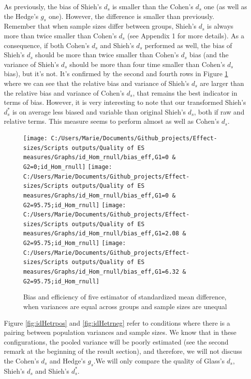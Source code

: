 \documentclass[
  man,floatsintext]{apa6}
\begin{document}
As previously, the bias of Shieh's \(d_s\) is smaller than the Cohen's \(d_s\) one (as well as the Hedge's \(g_s\) one). However, the difference is smaller than previously. Remember that when sample sizes differ between groups, Shieh's \(d_s\) is always more than twice smaller than Cohen's \(d_s\) (see Appendix 1 for more details). As a consequence, if both Cohen's \(d_s\) and Shieh's \(d_s\) performed as well, the bias of Shieh's \(d_s\) should be more than twice smaller than Cohen's \(d_s\) bias (and the variance of Shieh's \(d_s\) should be more than four time smaller than Cohen's \(d_s\) bias), but it's not. It's confirmed by the second and fourth rows in Figure \ref{fig:idHomrnull} where we can see that the relative bias and variance of Shieh's \(d_s\) are larger than the relative bias and variance of Cohen's \(d_s\), that remains the best indicator in terms of bias. However, it is very interesting to note that our transformed Shieh's \(d^*_s\) is on average less biased and variable than original Shieh's \(d_s\), both if raw and relative terms. This measure seems to perform almost as well as Cohen's \(d_s\).

\begin{figure}

{\centering \texttt{[image: C:/Users/Marie/Documents/Github\_projects/Effect-sizes/Scripts outputs/Quality of ES measures/Graphs/id\_Hom\_rnull/bias\_eff,G1=0 \& G2=0;id\_Hom\_rnull]} \texttt{[image: C:/Users/Marie/Documents/Github\_projects/Effect-sizes/Scripts outputs/Quality of ES measures/Graphs/id\_Hom\_rnull/bias\_eff,G1=0 \& G2=95.75;id\_Hom\_rnull]} \texttt{[image: C:/Users/Marie/Documents/Github\_projects/Effect-sizes/Scripts outputs/Quality of ES measures/Graphs/id\_Hom\_rnull/bias\_eff,G1=2.08 \& G2=95.75;id\_Hom\_rnull]} \texttt{[image: C:/Users/Marie/Documents/Github\_projects/Effect-sizes/Scripts outputs/Quality of ES measures/Graphs/id\_Hom\_rnull/bias\_eff,G1=6.32 \& G2=95.75;id\_Hom\_rnull]} 

}

\caption{Bias and efficiency of five estimator of standardized mean difference, when variances are equal across groups and sample sizes are unequal}\label{fig:idHomrnull}
\end{figure}

Figure \ref{fig:idHetrpos} and \ref{fig:idHetrneg} refer to conditions where there is a pairing between population variances and sample sizes. We know that in these configurations, the pooled variance will be poorly estimated (see the second remark at the beginning of the result section), and therefore, we will not discuss the Cohen's \(d_s\) and Hedge's \(g_s\).We will only compare the quality of Glass's \(d_s\), Shieh's \(d_s\) and Shieh's \(d^*_s\).
\end{document}
